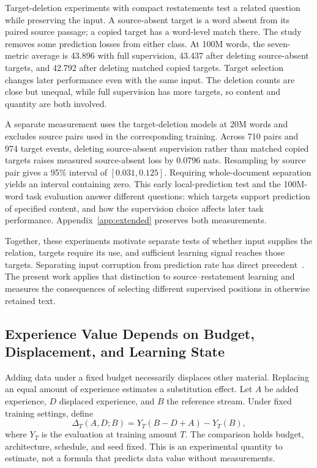 Target-deletion experiments with compact restatements test a related question while preserving the input. A source-absent target is a word absent from its paired source passage; a copied target has a word-level match there. The study removes some prediction losses from either class. At 100M words, the seven-metric average is 43.896 with full supervision, 43.437 after deleting source-absent targets, and 42.792 after deleting matched copied targets. Target selection changes later performance even with the same input. The deletion counts are close but unequal, while full supervision has more targets, so content and quantity are both involved.

A separate measurement uses the target-deletion models at 20M words and excludes source pairs used in the corresponding training. Across 710 pairs and 974 target events, deleting source-absent supervision rather than matched copied targets raises measured source-absent loss by 0.0796 nats. Resampling by source pair gives a 95\% interval of $[0.031,0.125]$. Requiring whole-document separation yields an interval containing zero. This early local-prediction test and the 100M-word task evaluation answer different questions: which targets support prediction of specified content, and how the supervision choice affects later task performance. Appendix~\ref{app:extended} preserves both measurements.

Together, these experiments motivate separate tests of whether input supplies the relation, targets require its use, and sufficient learning signal reaches those targets. Separating input corruption from prediction rate has direct precedent~\citep{wettig2023mask}. The present work applies that distinction to source--restatement learning and measures the consequences of selecting different supervised positions in otherwise retained text.

\subsection{Experience Value Depends on Budget, Displacement, and Learning State}

Adding data under a fixed budget necessarily displaces other material. Replacing an equal amount of experience estimates a substitution effect. Let $A$ be added experience, $D$ displaced experience, and $B$ the reference stream. Under fixed training settings, define
\begin{equation}
\Delta_T(A,D;B)=Y_T(B-D+A)-Y_T(B),
\label{eq:substitution}
\end{equation}
where $Y_T$ is the evaluation at training amount $T$. The comparison holds budget, architecture, schedule, and seed fixed. This is an experimental quantity to estimate, not a formula that predicts data value without measurements.

